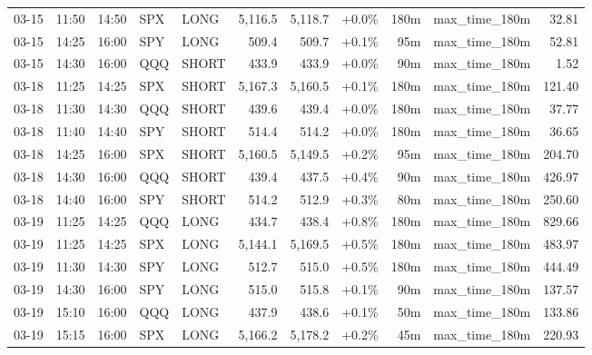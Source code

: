 \documentclass[11pt,a4paper,twoside]{article}
\begin{document}
\begin{center}
\begin{longtable}{>{\color{txtmain}}l l l l l r r r r >{\color{txtmain}}l r}
03-15 & 11:50 & 14:50 & SPX & LONG & 5,116.5 & 5,118.7 & \textcolor{wingreen}{+0.0\%} & 180m & max\_time\_180m & \textcolor{wingreen}{32.81} \\
03-15 & 14:25 & 16:00 & SPY & LONG & 509.4 & 509.7 & \textcolor{wingreen}{+0.1\%} & 95m & max\_time\_180m & \textcolor{wingreen}{52.81} \\
03-15 & 14:30 & 16:00 & QQQ & SHORT & 433.9 & 433.9 & \textcolor{wingreen}{+0.0\%} & 90m & max\_time\_180m & \textcolor{wingreen}{1.52} \\
03-18 & 11:25 & 14:25 & SPX & SHORT & 5,167.3 & 5,160.5 & \textcolor{wingreen}{+0.1\%} & 180m & max\_time\_180m & \textcolor{wingreen}{121.40} \\
03-18 & 11:30 & 14:30 & QQQ & SHORT & 439.6 & 439.4 & \textcolor{wingreen}{+0.0\%} & 180m & max\_time\_180m & \textcolor{wingreen}{37.77} \\
03-18 & 11:40 & 14:40 & SPY & SHORT & 514.4 & 514.2 & \textcolor{wingreen}{+0.0\%} & 180m & max\_time\_180m & \textcolor{wingreen}{36.65} \\
03-18 & 14:25 & 16:00 & SPX & SHORT & 5,160.5 & 5,149.5 & \textcolor{wingreen}{+0.2\%} & 95m & max\_time\_180m & \textcolor{wingreen}{204.70} \\
03-18 & 14:30 & 16:00 & QQQ & SHORT & 439.4 & 437.5 & \textcolor{wingreen}{+0.4\%} & 90m & max\_time\_180m & \textcolor{wingreen}{426.97} \\
03-18 & 14:40 & 16:00 & SPY & SHORT & 514.2 & 512.9 & \textcolor{wingreen}{+0.3\%} & 80m & max\_time\_180m & \textcolor{wingreen}{250.60} \\
03-19 & 11:25 & 14:25 & QQQ & LONG & 434.7 & 438.4 & \textcolor{wingreen}{+0.8\%} & 180m & max\_time\_180m & \textcolor{wingreen}{829.66} \\
03-19 & 11:25 & 14:25 & SPX & LONG & 5,144.1 & 5,169.5 & \textcolor{wingreen}{+0.5\%} & 180m & max\_time\_180m & \textcolor{wingreen}{483.97} \\
03-19 & 11:30 & 14:30 & SPY & LONG & 512.7 & 515.0 & \textcolor{wingreen}{+0.5\%} & 180m & max\_time\_180m & \textcolor{wingreen}{444.49} \\
03-19 & 14:30 & 16:00 & SPY & LONG & 515.0 & 515.8 & \textcolor{wingreen}{+0.1\%} & 90m & max\_time\_180m & \textcolor{wingreen}{137.57} \\
03-19 & 15:10 & 16:00 & QQQ & LONG & 437.9 & 438.6 & \textcolor{wingreen}{+0.1\%} & 50m & max\_time\_180m & \textcolor{wingreen}{133.86} \\
03-19 & 15:15 & 16:00 & SPX & LONG & 5,166.2 & 5,178.2 & \textcolor{wingreen}{+0.2\%} & 45m & max\_time\_180m & \textcolor{wingreen}{220.93} \\

\end{longtable}
\end{center}
\end{document}
